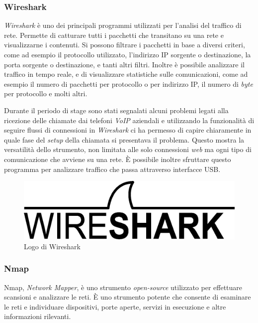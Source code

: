 \subsubsection{Wireshark}

\emph{Wireshark} è uno dei principali programmi utilizzati per l'analisi del traffico di rete. Permette di catturare tutti i pacchetti che transitano su una rete e visualizzarne i contenuti. Si possono filtrare i pacchetti in base a diversi criteri, come ad esempio il protocollo utilizzato, l'indirizzo IP sorgente o destinazione, la porta sorgente o destinazione, e tanti altri filtri. Inoltre è possibile analizzare il traffico in tempo reale, e di visualizzare statistiche sulle comunicazioni, come ad esempio il numero di pacchetti per protocollo o per indirizzo IP, il numero di \emph{byte} per protocollo e molti altri.

Durante il periodo di stage sono stati segnalati alcuni problemi legati alla ricezione delle chiamate dai telefoni \emph{VoIP} aziendali e utilizzando la funzionalità di seguire flussi di connessioni in \emph{Wireshark} ci ha permesso di capire chiaramente in quale fase del \emph{setup} della chiamata si presentava il problema. Questo mostra la versatilità dello strumento, non limitata alle solo connessioni \emph{web} ma ogni tipo di comunicazione che avviene su una rete. È possibile inoltre sfruttare questo programma per analizzare traffico che passa attraverso interfacce USB.

\begin{figure}[!htbp]
    \centering
    \includegraphics[width=0.6\linewidth]{images/loghi/wireshark.png}
    \caption{Logo di Wireshark}
    \label{fig:wireshark-logo}
\end{figure}

\subsubsection{Nmap}

Nmap, \emph{Network Mapper}, è uno strumento \emph{open-source} utilizzato per effettuare scansioni e analizzare le reti. È uno strumento potente che consente di esaminare le reti e individuare dispositivi, porte aperte, servizi in esecuzione e altre informazioni rilevanti.

